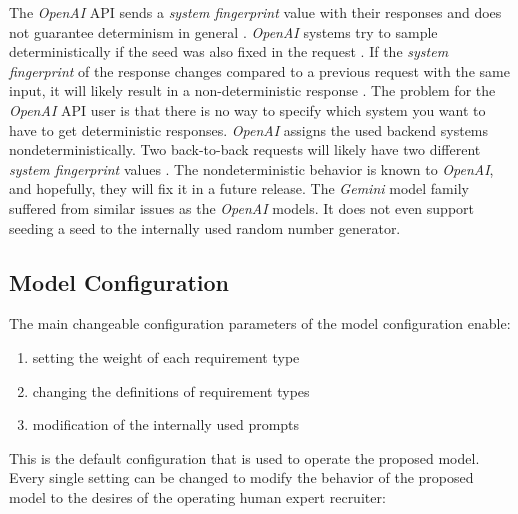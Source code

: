 \documentclass[draft,final]{thesisclass} %
\begin{document}
The \textit{OpenAI} API sends a \textit{system fingerprint} value with their responses and does not guarantee determinism in general \parencite{openai_chat_api}.
\textit{OpenAI} systems try to sample deterministically if the seed was also fixed in the request \parencite{openai_chat_api}.
If the \textit{system fingerprint} of the response changes compared to a previous request with the same input, it will likely result in a non-deterministic response \parencite{openai_chat_api}.
The problem for the \textit{OpenAI} API user is that there is no way to specify which system you want to have to get deterministic responses. \textit{OpenAI} assigns the used backend systems nondeterministically. Two back-to-back requests will likely have two different \textit{system fingerprint} values \parencite{openai_chat_api}.
The nondeterministic behavior is known to \textit{OpenAI}, and hopefully, they will fix it in a future release.
The \textit{Gemini} model family suffered from similar issues as the \textit{OpenAI} models. It does not even support seeding a seed to the internally used random number generator.

\subsection{Model Configuration} \label{model_configuration}
The main changeable configuration parameters of the model configuration enable:
\begin{enumerate}
    \item setting the weight of each requirement type
    \item changing the definitions of requirement types
    \item modification of the internally used prompts
\end{enumerate}
This is the default configuration that is used to operate the proposed model.
Every single setting can be changed to modify the behavior of the proposed model to the desires of the operating human expert recruiter:

\end{document}
